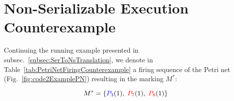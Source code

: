 
\section{Non-Serializable Execution Counterexample}
\label{appendix:non-serializable-execution-example}
Continuing the running example presented in subsec.~\ref{subsec:SerToNsTranslation}, we denote in Table~\ref{tab:PetriNetFiringCounterexample} a firing sequence of the Petri net (Fig.~\ref{fig:code2ExamplePN}) resulting in the marking \(M^*\):

\[
M^* = \{\textcolor{blue}{P_3}(1),\;\textcolor{red}{P_7}(1),\;\textcolor{red}{P_8}(1)\}
\]
%
%
%

%
%
%
%
%


